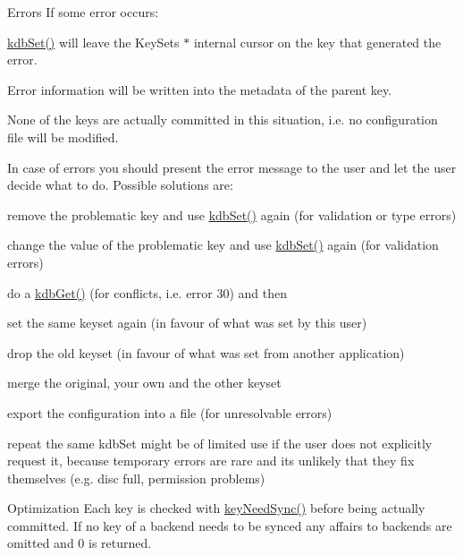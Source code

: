 \begin{DoxyParagraph}{Errors}
If some error occurs\+:
\begin{DoxyItemize}
\item \hyperlink{group__kdb_ga11436b058408f83d303ca5e996832bcf}{kdb\+Set()} will leave the Key\+Set\textquotesingle{}s $\ast$ internal cursor on the key that generated the error.
\item Error information will be written into the metadata of the parent key.
\item None of the keys are actually committed in this situation, i.\+e. no configuration file will be modified.
\end{DoxyItemize}
\end{DoxyParagraph}
In case of errors you should present the error message to the user and let the user decide what to do. Possible solutions are\+:
\begin{DoxyItemize}
\item remove the problematic key and use \hyperlink{group__kdb_ga11436b058408f83d303ca5e996832bcf}{kdb\+Set()} again (for validation or type errors)
\item change the value of the problematic key and use \hyperlink{group__kdb_ga11436b058408f83d303ca5e996832bcf}{kdb\+Set()} again (for validation errors)
\item do a \hyperlink{group__kdb_ga28e385fd9cb7ccfe0b2f1ed2f62453a1}{kdb\+Get()} (for conflicts, i.\+e. error 30) and then
\begin{DoxyItemize}
\item set the same keyset again (in favour of what was set by this user)
\item drop the old keyset (in favour of what was set from another application)
\item merge the original, your own and the other keyset
\end{DoxyItemize}
\item export the configuration into a file (for unresolvable errors)
\item repeat the same kdb\+Set might be of limited use if the user does not explicitly request it, because temporary errors are rare and its unlikely that they fix themselves (e.\+g. disc full, permission problems)
\end{DoxyItemize}

\begin{DoxyParagraph}{Optimization}
Each key is checked with \hyperlink{group__keytest_gaf247df0de7aca04b32ef80e39ef12950}{key\+Need\+Sync()} before being actually committed. If no key of a backend needs to be synced any affairs to backends are omitted and 0 is returned.
\end{DoxyParagraph}


